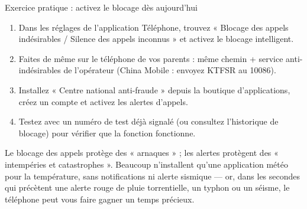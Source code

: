 \begin{tcbpractice}{Exercice pratique : activez le blocage dès aujourd'hui}
\begin{enumerate}
  \item Dans les réglages de l'application Téléphone, trouvez « Blocage des appels indésirables / Silence des appels inconnus » et activez le blocage intelligent.
  \item Faites de même sur le téléphone de vos parents : même chemin + service anti-indésirables de l'opérateur (China Mobile : envoyez KTFSR au 10086).
  \item Installez « Centre national anti-fraude » depuis la boutique d'applications, créez un compte et activez les alertes d'appels.
  \item Testez avec un numéro de test déjà signalé (ou consultez l'historique de blocage) pour vérifier que la fonction fonctionne.
\end{enumerate}

\end{tcbpractice}


Le blocage des appels protège des « arnaques » ; les alertes protègent des « intempéries et catastrophes ». Beaucoup n'installent qu'une application météo pour la température, sans notifications ni alerte sismique — or, dans les secondes qui précètent une alerte rouge de pluie torrentielle, un typhon ou un séisme, le téléphone peut vous faire gagner un temps précieux.


